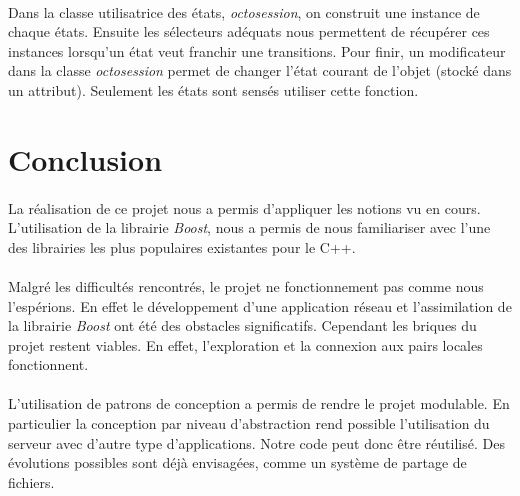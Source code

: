 \documentclass[a4paper]{article}
\begin{document}
			\paragraph{}{
			Dans la classe utilisatrice des états, \textit{octosession}, on construit une instance de chaque états.
			Ensuite les sélecteurs adéquats nous permettent de récupérer ces instances lorsqu'un état veut franchir 
			une transitions. \newline
			Pour finir, un modificateur dans la classe \textit{octosession} permet de changer l'état courant de l'objet 
			(stocké dans un attribut). Seulement les états sont sensés utiliser cette fonction.
			}
			
	\newpage

	\section*{Conclusion}
		\paragraph{}{
		La réalisation de ce projet nous a permis d'appliquer les notions vu en cours.
		L'utilisation de la librairie \textit{Boost}, nous a permis de nous familiariser avec l'une des 
		librairies les plus populaires existantes pour le C++.
		}
		\paragraph{}{
		Malgré les difficultés rencontrés, le projet ne fonctionnement pas comme nous l'espérions.
		En effet le développement d'une application réseau et l'assimilation de la librairie \textit{Boost}
		ont été des obstacles significatifs. \newline
		Cependant les briques du projet restent viables. En effet, l'exploration et la connexion aux
		pairs locales fonctionnent.
		}
		\paragraph{}{
		L'utilisation de patrons de conception a permis de rendre le projet modulable.
		En particulier la conception par niveau d’abstraction rend possible l'utilisation du serveur avec
		d'autre type d'applications. Notre code peut donc être réutilisé. Des évolutions possibles sont
		déjà envisagées, comme un système de partage de fichiers.
		}
\end{document}
